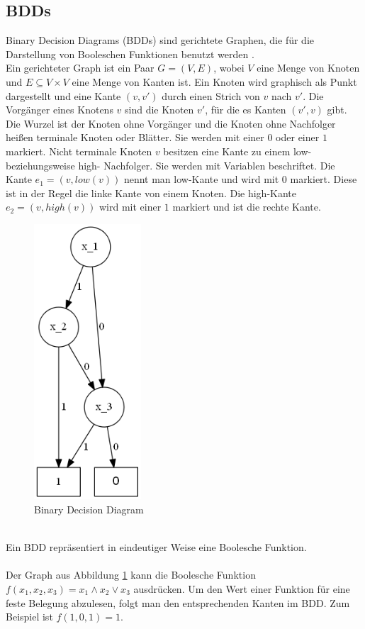 \documentclass[a4,abstract=on]{scrartcl}
\begin{document}
\subsection{BDDs}
Binary Decision Diagrams (BDDs) sind gerichtete Graphen, die für die Darstellung von Booleschen Funktionen benutzt werden \cite[vgl.][Seite 109-110]{bdd}.\\
Ein gerichteter Graph ist ein Paar $G=(V, E)$, wobei $V$ eine Menge von Knoten und $E \subseteq V \times V$  eine Menge von Kanten ist. Ein Knoten wird graphisch als Punkt dargestellt und eine Kante $(v, v')$ durch einen Strich von $v$ nach $v'$. Die Vorgänger eines Knotens $v$ sind die Knoten $v'$, für die es Kanten $(v', v)$ gibt. Die Wurzel ist der Knoten ohne Vorgänger und die Knoten ohne Nachfolger heißen terminale Knoten oder Blätter. Sie werden mit einer $0$ oder einer $1$ markiert. Nicht terminale Knoten $v$ besitzen eine Kante zu einem low- beziehungsweise high- Nachfolger. Sie werden mit Variablen beschriftet. Die Kante $e_1 = (v, low(v))$ nennt man low-Kante und wird mit $0$ markiert. Diese ist in der Regel die linke Kante von einem Knoten. Die high-Kante $e_2 = (v, high(v))$ wird mit einer $1$ markiert und ist die rechte Kante.

\begin{figure}[H]
\centering
\includegraphics[width=4cm]{bdd.png}
\caption{Binary Decision Diagram}
\label{fig:bdd}
\end{figure}
\ \\
Ein BDD repräsentiert in eindeutiger Weise eine Boolesche Funktion.\\
\ \\
Der Graph aus Abbildung \ref{fig:bdd} kann die Boolesche Funktion $f(x_1,x_2,x_3) = x_1\wedge x_2 \vee x_3$ ausdrücken. Um den Wert einer Funktion für eine feste Belegung abzulesen, folgt man den entsprechenden Kanten im BDD. Zum Beispiel ist $f(1,0,1)=1$.
\end{document}
